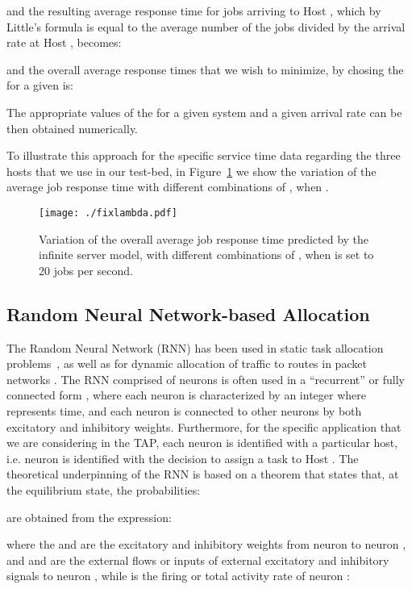 \documentclass[journal]{IEEEtran}
\begin{document}
and the resulting average response time for jobs arriving to Host , which by Little's formula \cite{Gelenbe-Mitrani} is 
equal to the average number of the jobs divided by the arrival rate at Host , becomes:

and the overall average response times that we wish to minimize, by chosing the
 for a given  is:

The appropriate values of the  for a given system and a given arrival rate  can be then obtained numerically.

To illustrate this approach for the specific service time data regarding the three hosts that we use in our test-bed, 
in Figure~\ref{fig:fixlambda} 
we show the variation of the average job response time with different combinations of ,
when  .  
\begin{figure}[ht]
     \centering
      \texttt{[image: ./fixlambda.pdf]} \caption{Variation of the overall average job response time predicted by the infinite server model, with different combinations of , when  is set to 20 jobs per second.}
     \label{fig:fixlambda}
    \end{figure}
		





\subsection{Random Neural Network-based Allocation} \label{RNN}

The Random Neural Network (RNN) has been used in static task allocation problems~\cite{Gelenbe2010_nearOptAssign}, as well as for dynamic allocation of traffic to routes in packet networks \cite{network1}. The RNN comprised of  neurons is often used in a ``recurrent'' or fully connected form \cite{RNN}, where each neuron  is characterized by an integer  where  represents time, and each neuron is connected to other neurons by both excitatory and inhibitory weights. Furthermore, for the specific application that we are considering in the TAP, each neuron is identified with a particular host, i.e. neuron  is identified with the
decision to assign a task to Host . The theoretical underpinning of the RNN \cite{Gelenbe1990_RNN,Gelenbe01112008} is based on a theorem that states that, at the equilibrium state,
the probabilities:

are obtained from the expression:

where the  and  are the excitatory and inhibitory weights from neuron  to neuron , and
 and  are the external flows or inputs of external excitatory and inhibitory signals to neuron ,
while  is the firing or total activity rate of neuron :
\end{document}
